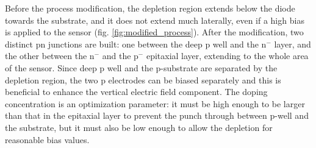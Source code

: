       Before the process modification, the depletion region extends below the diode towards the substrate, and it does not extend much laterally, even if a high bias is applied to the sensor (fig. \ref{fig:modified_process}). 
      After the modification, two distinct pn junctions are built: one between the deep p well and the n$^-$ layer, and the other between the n$^-$ and the p$^-$ epitaxial layer, extending to the whole area of the sensor.
      Since deep p well and the p-substrate are separated by the depletion region, the two p electrodes can be biased separately and this is beneficial to enhance the vertical electric field component.
      The doping concentration is an optimization parameter: it must be high enough to be larger than that in the epitaxial layer to prevent the punch through between p-well and the substrate, but it must also be low enough to allow the depletion for reasonable bias values.

